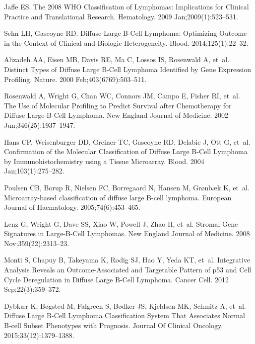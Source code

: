 \documentclass[10pt,letterpaper]{article}
\begin{document}
\begin{thebibliography}{10}

Jaffe ES.
\newblock The 2008 {WHO} Classification of Lymphomas: Implications for Clinical
  Practice and Translational Research.
\newblock Hematology. 2009 Jan;2009(1):523--531.

Sehn LH, Gascoyne RD.
\newblock Diffuse Large {B}-Cell Lymphoma: Optimizing Outcome in the Context of
  Clinical and Biologic Heterogeneity.
\newblock Blood. 2014;125(1):22--32.

Alizadeh AA, Eisen MB, Davis RE, Ma C, Lossos IS, Rosenwald A, et~al.
\newblock Distinct Types of Diffuse Large {B}-Cell Lymphoma Identified by Gene
  Expression Profiling.
\newblock Nature. 2000 Feb;403(6769):503--511.

Rosenwald A, Wright G, Chan WC, Connors JM, Campo E, Fisher RI, et~al.
\newblock The Use of Molecular Profiling to Predict Survival after Chemotherapy
  for Diffuse Large-{B}-Cell Lymphoma.
\newblock New England Journal of Medicine. 2002 Jun;346(25):1937--1947.

Hans CP, Weisenburger DD, Greiner TC, Gascoyne RD, Delabie J, Ott G, et~al.
\newblock Confirmation of the Molecular Classification of Diffuse Large
  {B}-Cell Lymphoma by Immunohistochemistry using a Tissue Microarray.
\newblock Blood. 2004 Jan;103(1):275--282.

Poulsen CB, Borup R, Nielsen FC, Borregaard N, Hansen M, Gr{\o}nb{\ae}k K,
  et~al.
\newblock Microarray-based classification of diffuse large {B}-cell lymphoma.
\newblock European Journal of Haematology. 2005;74(6):453--465.

Lenz G, Wright G, Dave SS, Xiao W, Powell J, Zhao H, et~al.
\newblock Stromal Gene Signatures in Large-{B}-Cell Lymphomas.
\newblock New England Journal of Medicine. 2008 Nov;359(22):2313--23.

Monti S, Chapuy B, Takeyama K, Rodig SJ, Hao Y, Yeda KT, et~al.
\newblock Integrative Analysis Reveals an Outcome-Associated and Targetable
  Pattern of {p53} and Cell Cycle Deregulation in Diffuse Large {B}-Cell
  Lymphoma.
\newblock Cancer Cell. 2012 Sep;22(3):359--372.

Dybk\ae{}r K, B\o{}gsted M, Falgreen S, B\o{}dker JS, Kjeldsen MK, Schmitz A,
  et~al.
\newblock Diffuse Large {B}-Cell Lymphoma Classification System That Associates
  Normal {B}-cell Subset Phenotypes with Prognosis.
\newblock Journal Of Clinical Oncology. 2015;33(12):1379--1388.


\end{thebibliography}
\end{document}
